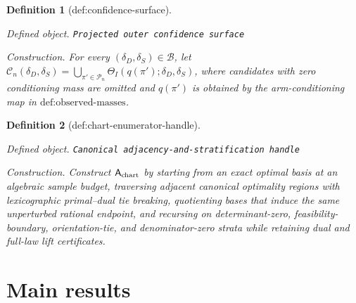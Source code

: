 \documentclass{article}
\newtheorem{definition}{Definition}
\begin{document}
\begin{definition}[def:confidence-surface]\label{def:confidence-surface}
\par\smallskip\noindent\emph{Defined object.} \texttt{Projected outer confidence surface}
\par\smallskip\noindent\emph{Construction.} For every \((\delta_D,\delta_S)\in\mathcal B\), let \(\mathcal C_n(\delta_D,\delta_S)=\bigcup_{\pi'\in\mathcal P_n}\Theta_I(q(\pi');\delta_D,\delta_S)\), where candidates with zero conditioning mass are omitted and \(q(\pi')\) is obtained by the arm-conditioning map in \(\text{def:observed-masses}\).
\end{definition}

\begin{definition}[def:chart-enumerator-handle]\label{def:chart-enumerator-handle}
\par\smallskip\noindent\emph{Defined object.} \texttt{Canonical adjacency-\allowbreak{}and-\allowbreak{}stratification handle}
\par\smallskip\noindent\emph{Construction.} Construct \(\mathsf A_{\rm chart}\) by starting from an exact optimal basis at an algebraic sample budget, traversing adjacent canonical optimality regions with lexicographic primal--dual tie breaking, quotienting bases that induce the same unperturbed rational endpoint, and recursing on determinant-zero, feasibility-boundary, orientation-tie, and denominator-zero strata while retaining dual and full-law lift certificates.
\end{definition}

\section{Main results}
\end{document}
